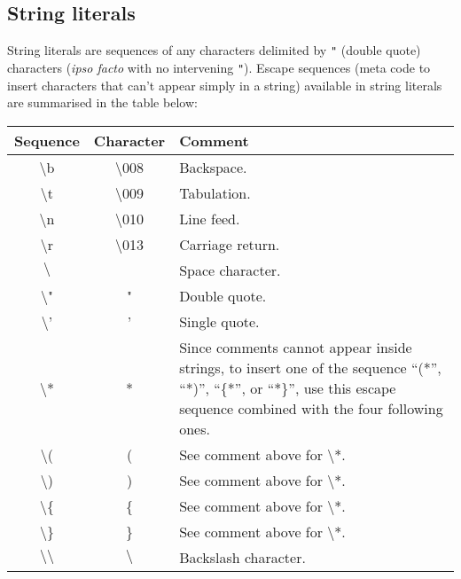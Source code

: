 \subsection{String literals}
\label{string literal}
String literals are sequences of any characters delimited by {\tt "}
(double quote) characters ({\em ipso facto} with no intervening
{\tt"}). 
Escape sequences (meta code to insert characters that can't appear
simply in a string) available in string literals are summarised in the
table below:

\medskip
\noindent
\begin{tabular}{|c|c|p{7cm}|}
  \hline
  Sequence & Character & Comment \\
  \hline
  $\setminus$b & $\setminus$008 & Backspace. \\
  \hline
  $\setminus$t & $\setminus$009 & Tabulation. \\
  \hline
  $\setminus$n & $\setminus$010 & Line feed. \\
  \hline
  $\setminus$r & $\setminus$013 & Carriage return. \\
  \hline
  $\setminus$\textvisiblespace & \textvisiblespace      & Space character. \\
  \hline
  $\setminus$" & "              & Double quote. \\
  \hline
  $\setminus$' & '              & Single quote. \\
  \hline
  $\setminus$* & *              & Since comments cannot appear inside
                                  strings, to insert one of the
                                  sequence ``(*'', ``*)'', ``\{*'', or
                                  ``*\}'', use this escape sequence
                                  combined with the four following
                                  ones. \\
  \hline
  $\setminus$( & (              & See comment above for $\setminus$*. \\
  \hline
  $\setminus$) & )              & See comment above for $\setminus$*. \\
  \hline
  $\setminus$\{ & \{              & See comment above for $\setminus$*. \\
  \hline
  $\setminus$\} & \}              & See comment above for $\setminus$*. \\
  \hline
  $\setminus\setminus$ & $\setminus$      & Backslash character. \\

\end{tabular}
